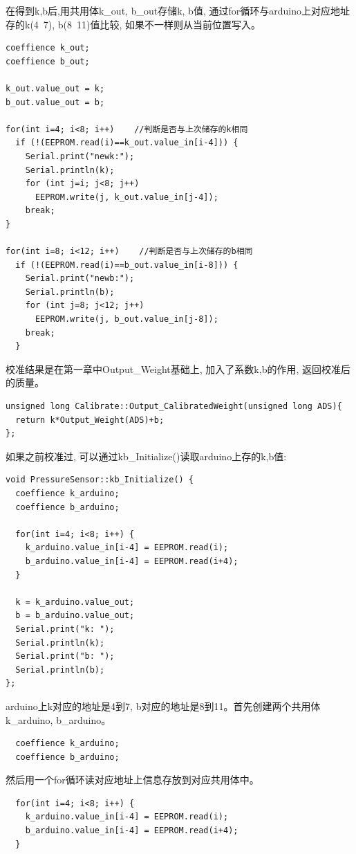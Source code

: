 \documentclass{article}
\begin{document}
在得到k,b后,用共用体k\_out, b\_out存储k, b值, 通过for循环与arduino上对应地址存的k(4~7), b(8~11)值比较, 
如果不一样则从当前位置写入。

\begin{lstlisting}
coeffience k_out;
coeffience b_out;

k_out.value_out = k;
b_out.value_out = b;

for(int i=4; i<8; i++)    //判断是否与上次储存的k相同
  if (!(EEPROM.read(i)==k_out.value_in[i-4])) {
    Serial.print("newk:");
    Serial.println(k);
    for (int j=i; j<8; j++) 
      EEPROM.write(j, k_out.value_in[j-4]);
    break;
}
        
for(int i=8; i<12; i++)    //判断是否与上次储存的b相同
  if (!(EEPROM.read(i)==b_out.value_in[i-8])) {
    Serial.print("newb:");
    Serial.println(b);
    for (int j=8; j<12; j++) 
      EEPROM.write(j, b_out.value_in[j-8]);
    break;
  }
\end{lstlisting}

校准结果是在第一章中Output\_Weight基础上, 加入了系数k,b的作用, 返回校准后的质量。
\begin{lstlisting}
unsigned long Calibrate::Output_CalibratedWeight(unsigned long ADS){
  return k*Output_Weight(ADS)+b;
};
\end{lstlisting}

如果之前校准过, 可以通过kb\_Initialize()读取arduino上存的k,b值:
\begin{lstlisting}
void PressureSensor::kb_Initialize() {
  coeffience k_arduino;
  coeffience b_arduino;
  
  for(int i=4; i<8; i++) {
    k_arduino.value_in[i-4] = EEPROM.read(i);
    b_arduino.value_in[i-4] = EEPROM.read(i+4);
  }

  k = k_arduino.value_out;
  b = b_arduino.value_out;
  Serial.print("k: ");
  Serial.println(k);
  Serial.print("b: ");
  Serial.println(b);
};
\end{lstlisting}

arduino上k对应的地址是4到7, b对应的地址是8到11。首先创建两个共用体k\_arduino, b\_arduino。
\begin{lstlisting}
  coeffience k_arduino;
  coeffience b_arduino; 
\end{lstlisting}

然后用一个for循环读对应地址上信息存放到对应共用体中。
\begin{lstlisting}
  for(int i=4; i<8; i++) {
    k_arduino.value_in[i-4] = EEPROM.read(i);
    b_arduino.value_in[i-4] = EEPROM.read(i+4);
  }  
\end{lstlisting}
\end{document}
